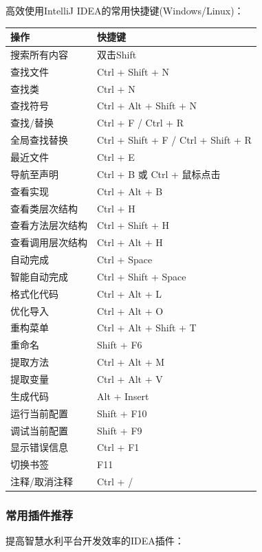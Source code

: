 高效使用IntelliJ IDEA的常用快捷键(Windows/Linux)：

\begin{longtable}[]{@{}ll@{}}
\toprule\noalign{}
操作 & 快捷键 \\
\midrule\noalign{}
\endhead
\bottomrule\noalign{}
\endlastfoot
搜索所有内容 & 双击Shift \\
查找文件 & Ctrl + Shift + N \\
查找类 & Ctrl + N \\
查找符号 & Ctrl + Alt + Shift + N \\
查找/替换 & Ctrl + F / Ctrl + R \\
全局查找替换 & Ctrl + Shift + F / Ctrl + Shift + R \\
最近文件 & Ctrl + E \\
导航至声明 & Ctrl + B 或 Ctrl + 鼠标点击 \\
查看实现 & Ctrl + Alt + B \\
查看类层次结构 & Ctrl + H \\
查看方法层次结构 & Ctrl + Shift + H \\
查看调用层次结构 & Ctrl + Alt + H \\
自动完成 & Ctrl + Space \\
智能自动完成 & Ctrl + Shift + Space \\
格式化代码 & Ctrl + Alt + L \\
优化导入 & Ctrl + Alt + O \\
重构菜单 & Ctrl + Alt + Shift + T \\
重命名 & Shift + F6 \\
提取方法 & Ctrl + Alt + M \\
提取变量 & Ctrl + Alt + V \\
生成代码 & Alt + Insert \\
运行当前配置 & Shift + F10 \\
调试当前配置 & Shift + F9 \\
显示错误信息 & Ctrl + F1 \\
切换书签 & F11 \\
注释/取消注释 & Ctrl + / \\
\end{longtable}

\subsubsection{常用插件推荐}\label{ux5e38ux7528ux63d2ux4ef6ux63a8ux8350}

提高智慧水利平台开发效率的IDEA插件：

